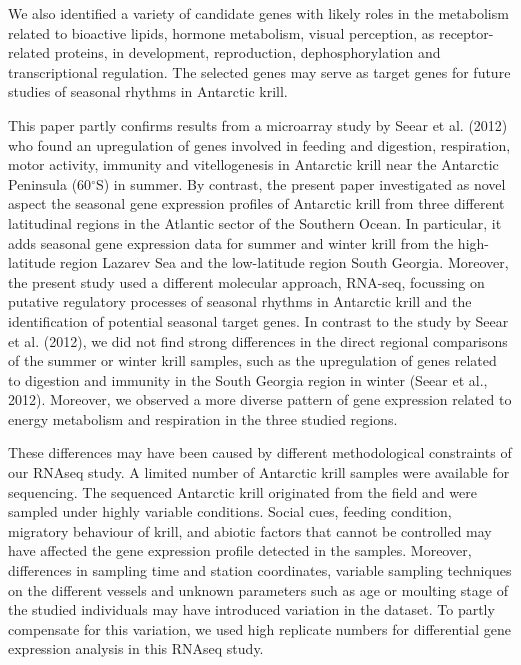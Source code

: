 We also identified a variety of candidate genes with likely roles in the
metabolism related to bioactive lipids, hormone metabolism, visual perception,
as receptor-related proteins, in development, reproduction, dephosphorylation
and transcriptional regulation. The selected genes may serve as target genes
for future studies of seasonal rhythms in Antarctic krill.

This paper partly confirms results from a microarray study by Seear et al.
(2012) who found an upregulation of genes involved in feeding and digestion,
respiration, motor activity, immunity and vitellogenesis in Antarctic krill
near the Antarctic Peninsula (60$^{\circ}$S) in summer. By contrast, the present
paper investigated as novel aspect the seasonal gene expression profiles of
Antarctic krill from three different latitudinal regions in the Atlantic sector
of the Southern Ocean. In particular, it adds seasonal gene expression data for
summer and winter krill from the high-latitude region Lazarev Sea and the
low-latitude region South Georgia. Moreover, the present study used a different
molecular approach, RNA-seq, focussing on putative regulatory processes of
seasonal rhythms in Antarctic krill and the identification of potential
seasonal target genes. In contrast to the study by Seear et al. (2012), we did
not find strong differences in the direct regional comparisons of the summer or
winter krill samples, such as the upregulation of genes related to digestion
and immunity in the South Georgia region in winter (Seear et al., 2012).
Moreover, we observed a more diverse pattern of gene expression related to
energy metabolism and respiration in the three studied regions.

These differences may have been caused by different methodological constraints
of our RNAseq study. A limited number of Antarctic krill samples were available
for sequencing. The sequenced Antarctic krill originated from the field and
were sampled under highly variable conditions. Social cues, feeding condition,
migratory behaviour of krill, and abiotic factors that cannot be controlled may
have affected the gene expression profile detected in the samples. Moreover,
differences in sampling time and station coordinates, variable sampling
techniques on the different vessels and unknown parameters such as age or
moulting stage of the studied individuals may have introduced variation in the
dataset. To partly compensate for this variation, we used high replicate
numbers for differential gene expression analysis in this RNAseq study.

